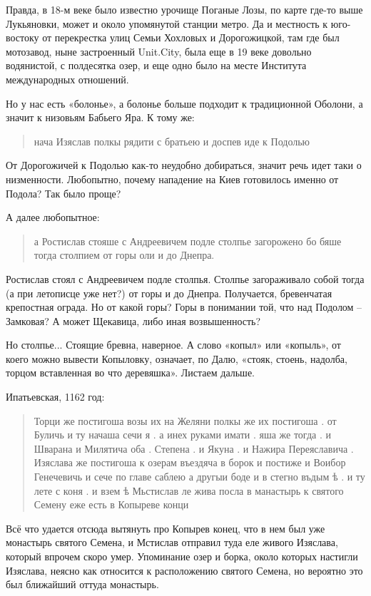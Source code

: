 \documentclass[a5paper,11pt,openany]{article}
\begin{document}
Правда, в 18-м веке было известно урочище Поганые Лозы, по карте где-то выше Лукьяновки, может и около упомянутой станции метро. Да и местность к юго-востоку от перекрестка улиц Семьи Хохловых и Дорогожицкой, там где был мотозавод, ныне застроенный Unit.City, была еще в 19 веке довольно водянистой, с полдесятка озер, и еще одно было на месте Института международных отношений.

Но у нас есть «болонье», а болонье больше подходит к традиционной Оболони, а значит к низовьям Бабьего Яра. К тому же:

\begin{quotation}
\noindent нача Изяслав полкы рядити с братьею и доспев иде к Подолью
\end{quotation}

От Дорогожичей к Подолью как-то неудобно добираться, значит речь идет таки о низменности. Любопытно, почему нападение на Киев готовилось именно от Подола? Так было проще? 

А далее любопытное:

\begin{quotation}
\noindent а Ростислав стояше с Андреевичем
подле столпье загорожено бо бяше тогда  столпием от горы оли и до Днепра.\end{quotation}

Ростислав стоял с Андреевичем подле столпья. Столпье загораживало собой тогда (а при летописце уже нет?) от горы и до Днепра. Получается, бревенчатая крепостная ограда. Но от какой горы? Горы в понимании той, что над Подолом – Замковая? А может Щекавица, либо иная возвышенность?

Но столпье... Стоящие бревна, наверное. А слово «копыл» или «копыль», от коего можно вывести Копыловку, означает, по Далю, «стояк,  стоень,  надолба, торцом  вставленная во что деревяшка». Листаем дальше.

Ипатьевская, 1162 год:

\begin{quotation}
\noindent Торци же постигоша возы их на Желяни полкы же их постигоша . от Буличь и ту начаша сечи я . а инех руками имати . яша же тогда . и Шварана  и Милятича оба . Степена . и Якуна . и Нажира Переяславича . Изяслава же постигоша к озерам въездяча в борок и постиже и Воибор Генечевичь и сече по главе саблею а другыи  боде и в стегно въдым ѣ . и ту лете с коня . и взем ѣ Мьстислав ле жива посла в манастырь к святого Семену еже есть  в Копыреве конци
\end{quotation}

Всё что удается отсюда вытянуть про Копырев конец, что в нем был уже монастырь святого Семена, и Мстислав отправил туда еле живого Изяслава, который впрочем скоро умер. Упоминание озер и борка, около которых настигли Изяслава, неясно как относится к расположению святого Семена, но вероятно это был ближайший оттуда монастырь.
\end{document}
